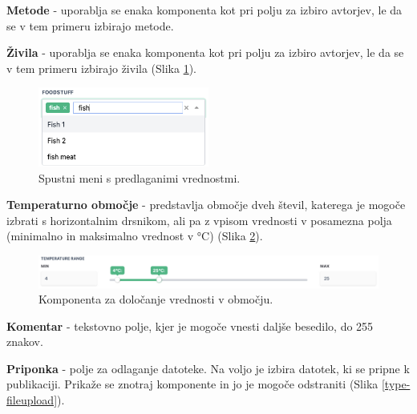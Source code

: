 \documentclass[a4paper, 12pt]{book}
\begin{document}
\begin{description}
    \item \textbf{Metode} - uporablja se enaka komponenta kot pri polju za izbiro avtorjev, le da se v tem primeru izbirajo metode. 
    
    \item \textbf{Živila} - uporablja se enaka komponenta kot pri polju za izbiro avtorjev, le da se v tem primeru izbirajo živila (Slika \ref{multiselect}).
    
    \begin{figure}[h]
        \begin{center}
        \includegraphics[width=0.5\textwidth]{slike/multiselect.png}
        \end{center}
        \caption{ Spustni meni s predlaganimi vrednostmi. }
        \label{multiselect}
    \end{figure}
    
    \item \textbf{Temperaturno območje} - predstavlja območje dveh števil, katerega je mogoče izbrati s horizontalnim drsnikom, ali pa z vpisom vrednosti v posamezna polja (minimalno in maksimalno vrednost v °C) (Slika  \ref{type-range}).
    
    \begin{figure}[h]
        \begin{center}
        \includegraphics[width=1\textwidth]{slike/type_range.png}
        \end{center}
        \caption{ Komponenta za določanje vrednosti v območju. }
        \label{type-range}
    \end{figure}
    
    \item \textbf{Komentar} - tekstovno polje, kjer je mogoče vnesti daljše besedilo, do 255 znakov.
    
    \item \textbf{Priponka} - polje za odlaganje datoteke. Na voljo je izbira datotek, ki se pripne k publikaciji. Prikaže se znotraj komponente in jo je mogoče odstraniti (Slika  \ref{type-fileupload}).
    

\end{description}
\end{document}
